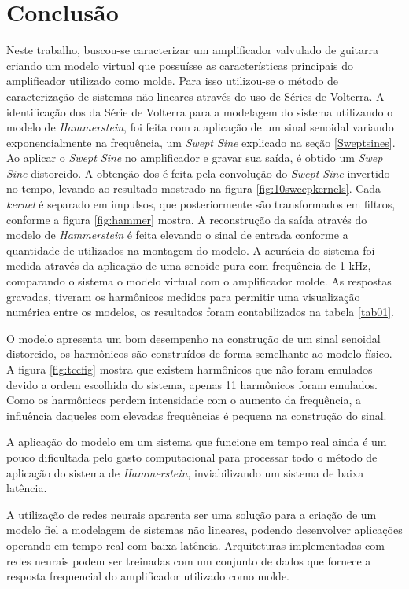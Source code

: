 \chapter{Conclusão}

Neste trabalho, buscou-se caracterizar um amplificador valvulado de guitarra criando um modelo virtual que possuísse as características principais do amplificador utilizado como molde. Para isso utilizou-se o método de caracterização de sistemas não lineares através do uso de Séries de Volterra. A identificação dos  da Série de Volterra para a modelagem do sistema utilizando o modelo de \textit{Hammerstein}, foi feita com a aplicação de um sinal senoidal variando exponencialmente na frequência, um \textit{Swept Sine} explicado na seção \ref{Sweptsines}. Ao aplicar o \textit{Swept Sine} no amplificador e gravar sua saída, é obtido um \textit{Swep Sine} distorcido. A obtenção dos  é feita pela convolução do \textit{Swept Sine} invertido no tempo, levando ao resultado mostrado na figura \ref{fig:10sweepkernels}. Cada \textit{kernel} é separado em impulsos, que posteriormente são transformados em filtros, conforme a figura \ref{fig:hammer} mostra. A reconstrução da saída através do modelo de \textit{Hammerstein} é feita elevando o sinal de entrada conforme a quantidade de  utilizados na montagem do modelo. A acurácia do sistema foi medida através da aplicação de uma senoide pura com frequência de 1 kHz, comparando o sistema o modelo virtual com o amplificador molde. As respostas gravadas, tiveram os harmônicos medidos para permitir uma visualização numérica entre os modelos, os resultados foram contabilizados na tabela \ref{tab01}.

O modelo apresenta um bom desempenho na construção de um sinal senoidal distorcido, os harmônicos são construídos de forma semelhante ao modelo físico. A figura \ref{fig:tccfig} mostra que existem harmônicos que não foram emulados devido a ordem escolhida do sistema, apenas 11 harmônicos foram emulados. Como os harmônicos perdem intensidade com o aumento da frequência, a influência daqueles com elevadas frequências é pequena na construção do sinal.

A aplicação do modelo em um sistema que funcione em tempo real ainda é um pouco dificultada pelo gasto computacional para processar todo o método de aplicação do sistema de \textit{Hammerstein}, inviabilizando um sistema de baixa latência.

A utilização de redes neurais aparenta ser uma solução para a criação de um modelo fiel a modelagem de sistemas não lineares, podendo desenvolver aplicações operando em tempo real com baixa latência. Arquiteturas implementadas com redes neurais podem ser treinadas com um conjunto de dados que fornece a resposta frequencial do amplificador utilizado como molde.